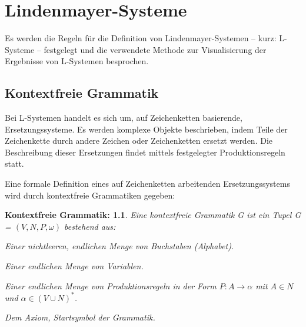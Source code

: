 \chapter{Lindenmayer-Systeme} \label{ch:LSysteme}

Es werden die Regeln für die Definition von Lindenmayer-Systemen -- kurz: L-Systeme -- festgelegt und die verwendete Methode zur Visualisierung der Ergebnisse von L-Systemen besprochen. 

\section{Kontextfreie Grammatik}

Bei L-Systemen handelt es sich um, auf Zeichenketten basierende, Ersetzungssysteme. Es werden komplexe Objekte beschrieben, indem Teile der Zeichenkette durch andere Zeichen oder Zeichenketten ersetzt werden. Die Beschreibung dieser Ersetzungen findet mittels festgelegter Produktionsregeln statt. \cite[S.2]{ABOP:04} 

Eine formale Definition eines auf Zeichenketten arbeitenden Ersetzungssystems wird durch kontextfreie Grammatiken gegeben:

\newtheorem{defKontextfreieGrammatik}{Kontextfreie Grammatik:}[chapter]
\begin{defKontextfreieGrammatik}
	Eine kontextfreie Grammatik G ist ein Tupel G = $(V, N, P, \omega)$ bestehend aus:
	
	\begin{description}[labelindent]
		\item[\boldmath$V$] Einer nichtleeren, endlichen Menge von Buchstaben (Alphabet).\\
		
		\item[\boldmath$N$] Einer endlichen Menge von Variablen.\\
		
		\item[\boldmath$P$] Einer endlichen Menge von Produktionsregeln in der Form $P: A \rightarrow \alpha$ mit $A \in N$ und $\alpha \in (V \cup N )^*$.\\
		
		\item[\boldmath$\omega \in N$] Dem Axiom, Startsymbol der Grammatik.\\
		
	\end{description}
	\cite[S.343]{ThI:14}
\end{defKontextfreieGrammatik}

